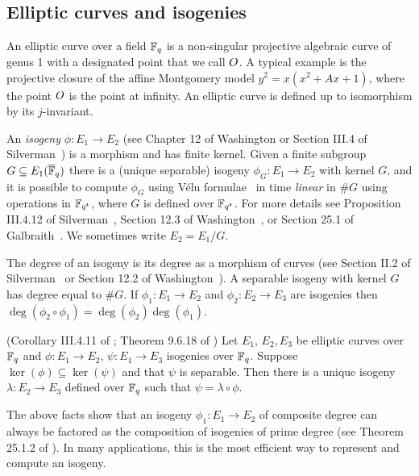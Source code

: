 \subsection{Elliptic curves and isogenies}
\label{sec:EC-and-isogeny}

An elliptic curve over a field $\mathbb{F}_q$ is a non-singular projective algebraic curve of genus 1 with a designated point that we call $O$. A typical example is the projective closure of the affine Montgomery model $y^2 = x(x^2 + Ax  + 1)$, where the point $O$ is the point at infinity.
An elliptic curve is defined up to isomorphism by its $j$-invariant.

An \emph{isogeny} $\phi : E_1 \to E_2$ (see Chapter 12 of Washington \cite{Was08} or Section III.4 of Silverman~\cite{Silverman}) is a morphism and has finite kernel. 
Given a finite subgroup $G \subseteq E_1( \overline{\mathbb{F}}_q )$ there is a (unique separable) isogeny $\phi_G : E_1 \to E_2$ with kernel $G$, and it is possible to compute $\phi_G$ using V{\' e}lu formulae~\cite{Velu} in time \emph{linear} in $\#G$ using operations in $\mathbb{F}_{q^t}$, where $G$ is defined over $\mathbb{F}_{q^t}$.
For more details see Proposition III.4.12 of Silverman~\cite{Silverman}, Section 12.3 of Washington~\cite{Was08}, or Section 25.1 of Galbraith~\cite{Gal12}.
We sometimes write $E_2 = E_1 / G$. %



The degree of an isogeny is its degree as a morphism of curves (see Section II.2 of Silverman~\cite{Silverman} or Section 12.2 of Washington~\cite{Was08}).
A separable isogeny with kernel $G$ has degree equal to $\#G$.
If $\phi_1 : E_1 \rightarrow E_2$
and $\phi_2 : E_2 \rightarrow E_3$ are isogenies then
$\deg( \phi_2 \circ \phi_1 ) = \deg( \phi_2 ) \deg( \phi_1 )$.



\begin{theorem} 
(Corollary III.4.11 of \cite{Silverman}; Theorem 9.6.18 of \cite{Gal12})
Let $E_1$, $E_2, E_3$ be elliptic curves over $\mathbb{F}_q$
and $\phi : E_1 \rightarrow E_2$, $\psi : E_1 \rightarrow E_3$
isogenies over $\mathbb{F}_q$. Suppose $\ker(\phi) \subseteq \ker( \psi )$ and
that $\psi$ is separable.
Then there is a unique isogeny $\lambda : E_2 \rightarrow E_3$
defined over $\mathbb{F}_q$ such that $\psi = \lambda \circ \phi$.
\end{theorem}

The above facts show that an isogeny $\phi_1 : E_1 \rightarrow E_2$ of composite degree can always be factored as the composition of isogenies of prime degree (see Theorem 25.1.2 of \cite{Gal12}). In many applications, this is the most efficient way to represent and compute an isogeny.

